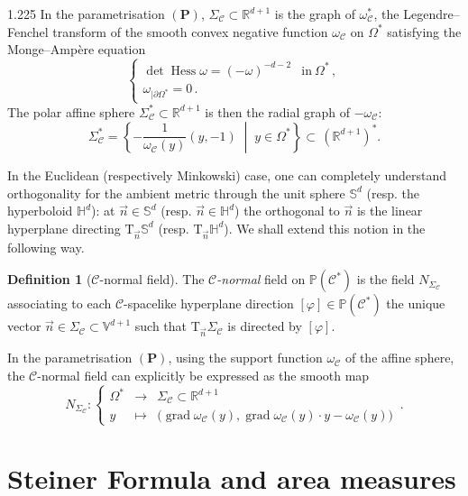 \documentclass[reqno, a4paper]{amsart}
\numberwithin{equation}{section}
\numberwithin{figure}{section}
\theoremstyle{definition}
\newtheorem{definition}[theorem]{Definition}
\theoremstyle{remark}
\newcommand{\R}{\mathbb{R}} %
\newcommand{\V}{\mathbb{V}} %
\renewcommand{\P}{\mathbb{P}} %
\newcommand{\Sph}{\mathbb{S}} %
\renewcommand{\H}{\mathbb{H}} %
\DeclareMathOperator{\grad}{grad} %
\DeclareMathOperator{\Hess}{Hess} %
\newcommand{\C}{\mathcal{C}} %
\renewcommand{\S}{\Sigma_\C} %
\newcommand{\st}{\; \middle\vert \;} %
\newcommand{\namelessfunction}[4]{ \left\lbrace \begin{matrix}
{#1} &\longrightarrow& {#2}\\
{#3} & \longmapsto & {#4}
\end{matrix} \right. }
\newcommand{\function}[5]{{#1}: \namelessfunction{#2}{#3}{#4}{#5}}
\newcommand{\bp}[1]{{\bigl( {#1} \bigr)}} %
\begin{document}
\begin{spacing}{1.225}
In the parametrisation $(\mathbf{P})$, $\S \subset \R^{d+1}$ is the graph of $\omega_\C^*$, the Legendre--Fenchel transform of the smooth convex negative function $\omega_\C$ on $\Omega^*$ satisfying the Monge--Amp\`ere equation 
\begin{equation}
\label{eq MA aff sphere}
\begin{cases}
\det \Hess \omega= (-\omega)^{-d-2} & \text{in} \ \Omega^* \, ,\\
\omega_{\vert \partial\Omega^*} =0 \, .
\end {cases}
\end{equation}
The polar affine sphere $\S^* \subset \R^{d+1}$ is then the radial graph of $-\omega_\C$:
 \begin{equation*}
 \S^* = \left\lbrace -\frac{1}{\omega_\C(y)} (y,-1) \st y \in \Omega^*\right\rbrace \subset \, (\R^{d+1})^*. 
 \end{equation*}

In the Euclidean (respectively Minkowski) case, one can completely understand orthogonality for the ambient metric through the unit sphere $\Sph^d$ (resp. the hyperboloid $\H^{d}$): at $\vec{n} \in \Sph^d$ (resp. $ \vec{n} \in \H^{d}$) the orthogonal to $\vec{n}$ is the linear hyperplane directing $\mathrm{T}_{\vec{n}}\Sph^d$ (resp. $\mathrm{T}_{\vec{n}}\H^d$). We shall extend this notion in the following way.

\begin{definition}[$\C$-normal field]
\label{def C-normal vf}
The \emph{$\C$-normal} field on $\P(\C^*)$ is the field $N_{\S}$ associating to each $\C$-spacelike hyperplane direction $[\varphi] \in \P(\C^*)$ the unique vector $\vec{n} \in \S \subset\V^{d+1}$ such that $\mathrm{T}_{\vec{n}}\S$ is directed by $[\varphi]$. 
\end{definition} 

In the parametrisation $(\mathbf{P})$, using the support function $\omega_\C$ of the affine sphere, the $\C$-normal field can explicitly be expressed as the smooth map
\begin{equation}
\label{eq expression of the C-normal field}
\function{N_{\S}}{\Omega^*}{\S \subset\R^{d+1}}{y}{\bp{\grad \omega_\C(y) , \grad \omega_\C(y) \cdot y -\omega_\C (y)}} \,. 
\end{equation}

\section{Steiner Formula and area measures}


\end{spacing}
\end{document}
